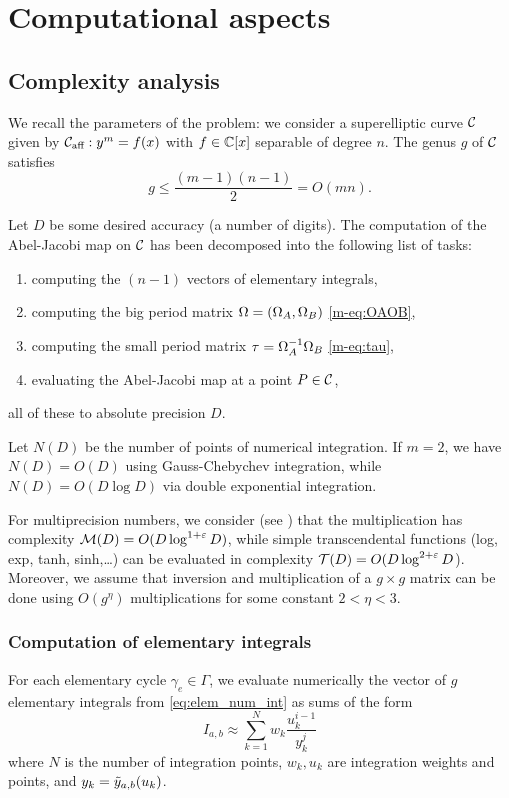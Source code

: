 \documentclass[main.tex]{subfiles}
\begin{document}
  \section{Computational aspects}

   \subsection{Complexity analysis}

   We recall the parameters of the problem: we consider a superelliptic curve $\mathcal{C}$ given by
   $\mathcal{C}_{\text{aff}}:y^m=f(x)$ with $f \in \mathbb{C}[x]$ separable of degree $n$. The genus $g$ of $\mathcal{C}$ satisfies
   $$g \leq \frac{(m-1)(n-1)}2=O(mn).$$

   Let $D$ be some desired accuracy (a number of digits). The computation of
   the Abel-Jacobi map on $\mathcal{C}$ has been decomposed into the
   following list of tasks:
   \begin{enumerate}
       \item computing the $(n-1)$ vectors of elementary integrals,
       \item computing the big period matrix $\Omega=(\Omega_A,\Omega_B)$ \eqref{m-eq:OAOB},
       \item computing the small period matrix $\tau = \Omega_A^{-1}\Omega_B$ \eqref{m-eq:tau},
       \item evaluating the Abel-Jacobi map at a point $P \in \mathcal{C}$,
   \end{enumerate}
   all of these to absolute precision $D$.

   Let $N(D)$ be the number of points of numerical integration.
   If $m=2$, we have
   $N(D)=O(D)$ using Gauss-Chebychev integration, while $N(D)=O(D\log D)$
   via double exponential integration.

   For multiprecision numbers, we consider (see \cite{BrentZimmermann}) that the multiplication has
   complexity $\mathcal M(D)=O(D \log^{1+\varepsilon}D)$,
   while simple transcendental functions (log, exp, tanh, sinh,\dots) can be evaluated
   in complexity $\mathcal T(D)=O(D\log^{2+\varepsilon} D$).
    Moreover, we assume that inversion and multiplication of a $g \times g$ matrix can be done using
    $O(g^{\eta})$ multiplications for some constant $2 < \eta < 3$.
   
   \subsubsection{Computation of elementary integrals}

   For each elementary cycle $\gamma_e\in \Gamma$, we evaluate numerically the vector of $g$
   elementary integrals from \eqref{eq:elem_num_int} as sums of the form
   \begin{equation}
       I_{a,b} \approx \sum_{k=1}^N w_k\frac{u_k^{i-1}}{y_k^j}
   \end{equation}
   where $N$ is the number of integration points, $w_k,u_k$ are integration weights and points,
   and $y_k=\tilde{y}_{a,b}(u_k)$.
\end{document}
